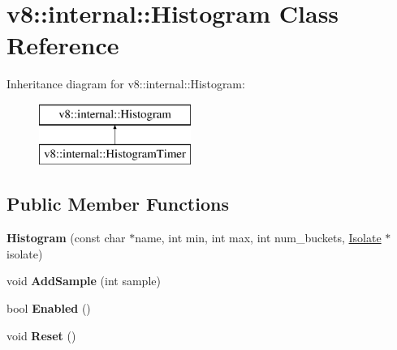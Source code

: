 \hypertarget{classv8_1_1internal_1_1_histogram}{}\section{v8\+:\+:internal\+:\+:Histogram Class Reference}
\label{classv8_1_1internal_1_1_histogram}
Inheritance diagram for v8\+:\+:internal\+:\+:Histogram\+:\begin{figure}[H]
\begin{center}
\leavevmode
\includegraphics[height=2.000000cm]{classv8_1_1internal_1_1_histogram}
\end{center}
\end{figure}
\subsection*{Public Member Functions}
\begin{DoxyCompactItemize}
\item 
\hypertarget{classv8_1_1internal_1_1_histogram_a0c78098797ab2745d447867241391696}{}{\bfseries Histogram} (const char $\ast$name, int min, int max, int num\+\_\+buckets, \hyperlink{classv8_1_1internal_1_1_isolate}{Isolate} $\ast$isolate)\label{classv8_1_1internal_1_1_histogram_a0c78098797ab2745d447867241391696}

\item 
\hypertarget{classv8_1_1internal_1_1_histogram_a1fa018dc2756acdc3a1bb4fdbe97ae86}{}void {\bfseries Add\+Sample} (int sample)\label{classv8_1_1internal_1_1_histogram_a1fa018dc2756acdc3a1bb4fdbe97ae86}

\item 
\hypertarget{classv8_1_1internal_1_1_histogram_a8c6f22e6b5446dfc455a8af4e97eb21b}{}bool {\bfseries Enabled} ()\label{classv8_1_1internal_1_1_histogram_a8c6f22e6b5446dfc455a8af4e97eb21b}

\item 
\hypertarget{classv8_1_1internal_1_1_histogram_a74a1b1e9c261914088b73e0b36bbb737}{}void {\bfseries Reset} ()\label{classv8_1_1internal_1_1_histogram_a74a1b1e9c261914088b73e0b36bbb737}

\end{DoxyCompactItemize}
